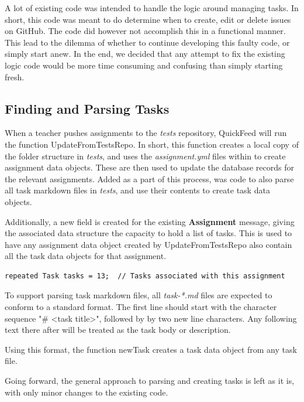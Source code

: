 A lot of existing code was intended to handle the logic around managing tasks. 
In short, this code was meant to do determine when to create, edit or delete issues on GitHub.
The code did however not accomplish this in a functional manner.
This lead to the dilemma of whether to continue developing this faulty code, or simply start anew.
In the end, we decided that any attempt to fix the existing logic code would be more time consuming and confusing than simply starting fresh.

\subsection{Finding and Parsing Tasks}
\label{sec:parsing_tasks}

When a teacher pushes assignments to the \textit{tests} repository, QuickFeed will run the function UpdateFromTestsRepo.
In short, this function creates a local copy of the folder structure in \textit{tests}, and uses the \textit{assignment.yml} files within to create assignment data objects.
These are then used to update the database records for the relevant assignments.
Added as a part of this process, was code to also parse all task markdown files in \textit{tests}, and use their contents to create task data objects.

Additionally, a new field is created for the existing \textbf{Assignment} message, giving the associated data structure the capacity to hold a list of tasks.
This is used to have any assignment data object created by UpdateFromTestsRepo also contain all the task data objects for that assignment.
\begin{lstlisting}[caption={Modification to the Assignment message}, numbers=none]
repeated Task tasks = 13;  // Tasks associated with this assignment
\end{lstlisting}

To support parsing task markdown files, all \textit{task-*.md} files are expected to conform to a standard format.
The first line should start with the character sequence "\# <task title>", followed by by two new line characters.
Any following text there after will be treated as the task body or description.

Using this format, the function newTask creates a task data object from any task file.



Going forward, the general approach to parsing and creating tasks is left as it is, with only minor changes to the existing code.

